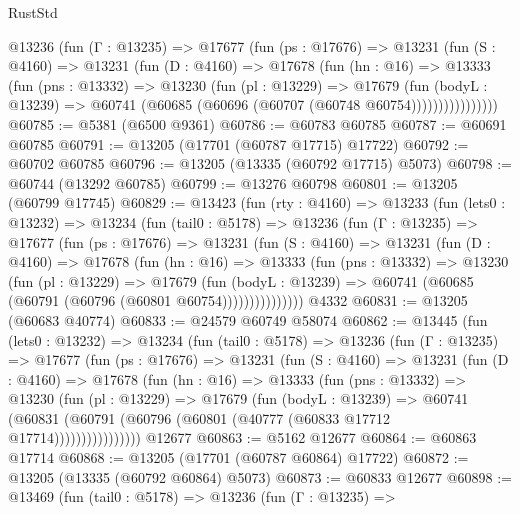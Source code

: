 \begin{lexlean}{RustStd}
\begin{coremodule}
          @13236
            (fun (Γ : @13235) =>
            @17677
              (fun (ps : @17676) =>
              @13231
                (fun (S : @4160) =>
                @13231
                  (fun (D : @4160) =>
                  @17678
                    (fun (hn : @16) =>
                    @13333
                      (fun (pns : @13332) =>
                      @13230
                        (fun (pl : @13229) =>
                        @17679
                          (fun (bodyL : @13239) =>
                          @60741 (@60685 (@60696 (@60707 (@60748 @60754))))))))))))))))
@60785 := @5381 (@6500 @9361)
@60786 := @60783 @60785
@60787 := @60691 @60785
@60791 := @13205 (@17701 (@60787 @17715) @17722)
@60792 := @60702 @60785
@60796 := @13205 (@13335 (@60792 @17715) @5073)
@60798 := @60744 (@13292 @60785)
@60799 := @13276 @60798
@60801 := @13205 (@60799 @17745)
@60829 := @13423
    (fun (rty : @4160) =>
    @13233
      (fun (lets0 : @13232) =>
      @13234
        (fun (tail0 : @5178) =>
        @13236
          (fun (Γ : @13235) =>
          @17677
            (fun (ps : @17676) =>
            @13231
              (fun (S : @4160) =>
              @13231
                (fun (D : @4160) =>
                @17678
                  (fun (hn : @16) =>
                  @13333
                    (fun (pns : @13332) =>
                    @13230
                      (fun (pl : @13229) =>
                      @17679
                        (fun (bodyL : @13239) =>
                        @60741 (@60685 (@60791 (@60796 (@60801 @60754)))))))))))))))
    @4332
@60831 := @13205 (@60683 @40774)
@60833 := @24579 @60749 @58074
@60862 := @13445
    (fun (lets0 : @13232) =>
    @13234
      (fun (tail0 : @5178) =>
      @13236
        (fun (Γ : @13235) =>
        @17677
          (fun (ps : @17676) =>
          @13231
            (fun (S : @4160) =>
            @13231
              (fun (D : @4160) =>
              @17678
                (fun (hn : @16) =>
                @13333
                  (fun (pns : @13332) =>
                  @13230
                    (fun (pl : @13229) =>
                    @17679
                      (fun (bodyL : @13239) =>
                      @60741
                        (@60831
                          (@60791 (@60796 (@60801 (@40777 (@60833 @17712 @17714))))))))))))))))
    @12677
@60863 := @5162 @12677
@60864 := @60863 @17714
@60868 := @13205 (@17701 (@60787 @60864) @17722)
@60872 := @13205 (@13335 (@60792 @60864) @5073)
@60873 := @60833 @12677
@60898 := @13469
    (fun (tail0 : @5178) =>
    @13236
      (fun (Γ : @13235) =>

\end{coremodule}
\end{lexlean}
